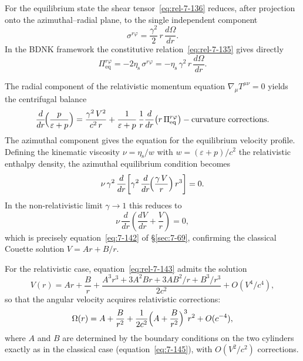 For the equilibrium state the shear tensor~\eqref{eq:rel-7-136}
reduces, after projection onto the azimuthal--radial plane, to the
single independent component
\begin{equation}
\label{eq:rel-7-140}
\sigma^{r\varphi}
  = \frac{\gamma^{2}}{2}\,r\,\frac{d\Omega}{dr}.
\end{equation}
In the BDNK framework the constitutive
relation~\eqref{eq:rel-7-135} gives directly
\begin{equation}
\label{eq:rel-7-141}
\Pi^{r\varphi}_{\mathrm{eq}}
  = -2\eta_{\mathrm{s}}\,\sigma^{r\varphi}
  = -\eta_{\mathrm{s}}\,\gamma^{2}\,r\,\frac{d\Omega}{dr}.
\end{equation}

The radial component of the relativistic momentum equation
$\nabla_{\mu}T^{\mu\nu}=0$ yields the centrifugal balance
\begin{equation}
\label{eq:rel-7-142}
\frac{d}{dr}\!\Bigl(\frac{p}{\varepsilon+p}\Bigr)
  = \frac{\gamma^{2}\,V^{2}}{c^{2}\,r}
  + \frac{1}{\varepsilon+p}\,
    \frac{1}{r}\frac{d}{dr}\bigl(r\,\Pi^{r\varphi}_{\mathrm{eq}}\bigr)
    - \text{curvature corrections}.
\end{equation}
The azimuthal component gives the equation for the equilibrium
velocity profile.  Defining the kinematic viscosity
$\nu=\eta_{\mathrm{s}}/w$ with
$w=(\varepsilon+p)/c^{2}$ the relativistic enthalpy density, the
azimuthal equilibrium condition becomes
\begin{equation}
\label{eq:rel-7-143}
\nu\,\gamma^{2}\,\frac{d}{dr}\!\left[
  \gamma^{2}\,\frac{d}{dr}\!\Bigl(
    \frac{\gamma\,V}{r}\Bigr)\,r^{3}
\right] = 0.
\end{equation}
In the non-relativistic limit $\gamma\to 1$ this reduces to
\begin{equation}
\label{eq:rel-7-144}
\nu\,\frac{d}{dr}\!\left(\frac{dV}{dr}+\frac{V}{r}\right) = 0,
\end{equation}
which is precisely equation~\eqref{eq:7-142} of \S\ref{sec:7-69},
confirming the classical Couette solution
$V=Ar+B/r$.

For the relativistic case, equation~\eqref{eq:rel-7-143} admits the
solution
\begin{equation}
\label{eq:rel-7-145}
V(r) = Ar + \frac{B}{r}
  + \frac{A^{3}r^{3}+3A^{2}Br+3AB^{2}/r+B^{3}/r^{3}}{2c^{2}}
  + O(V^{4}/c^{4}),
\end{equation}
so that the angular velocity acquires relativistic corrections:
\begin{equation}
\label{eq:rel-7-146}
\Omega(r) = A + \frac{B}{r^{2}}
  + \frac{1}{2c^{2}}\Bigl(A + \frac{B}{r^{2}}\Bigr)^{3}r^{2}
  + O(c^{-4}),
\end{equation}
where $A$ and $B$ are determined by the boundary conditions on the
two cylinders exactly as in the classical case
(equation~\eqref{eq:7-145}), with $O(V^{2}/c^{2})$ corrections.

